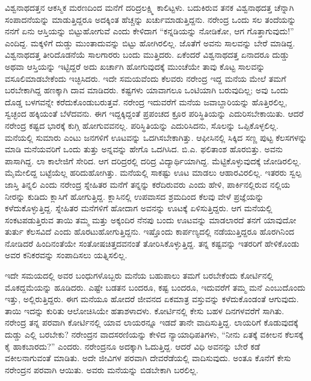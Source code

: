 ವಿಶ್ವನಾಥದತ್ತನ ಆಕಸ್ಮಿಕ ಮರಣದಿಂದ ಮನೆಗೆ ದರಿದ್ರಲಕ್ಷ್ಮಿ ಕಾಲಿಟ್ಟಳು. ಬದುಕಿರುವ ತನಕ ವಿಶ್ವನಾಥದತ್ತ ಚೆನ್ನಾಗಿ ಸಂಪಾದನೆಯನ್ನು ಮಾಡುತ್ತಿದ್ದರೂ ಅದಕ್ಕಿಂತ ಹೆಚ್ಚನ್ನು ಖರ್ಚುಮಾಡುತ್ತಿದ್ದನು. ನರೇಂದ್ರ ಒಂದು ಸಲ ತಂದೆಯನ್ನು ನನಗೆ ಏನು ಆಸ್ತಿಯನ್ನು ಬಿಟ್ಟುಹೋಗುವೆ ಎಂದು ಕೇಳಿದಾಗ “ಕನ್ನಡಿಯನ್ನು ನೋಡಿಕೋ, ಆಗ ಗೊತ್ತಾಗುವುದು!” ಎಂದಿದ್ದ. ಮಕ್ಕಳಿಗೆ ದುಡ್ಡು ಮುಂತಾದುವನ್ನು ಬಿಟ್ಟು ಹೋಗಿರಲಿಲ್ಲ. ಜೊತೆಗೆ ಅವನು ಸಾಲವನ್ನು ಬೇರೆ ಮಾಡಿದ್ದ. ವಿಶ್ವನಾಥದತ್ತ ತೀರಿದೊಡನೆಯೆ ಸಾಲಗಾರರು ಬಂದು ಮುತ್ತಿದರು. ಏಕೆಂದರೆ ವಿಶ್ವನಾಥದತ್ತ ಏನಾದರೂ ದುಡ್ಡು ಅಥವಾ ಆಸ್ತಿಯನ್ನು ಇಟ್ಟಿದ್ದರೆ ಅದು ಖರ್ಚಾಗಿ ಹೋಗುವುದಕ್ಕೆ ಮುಂಚೆಯೇ ತಾವು ಕೊಟ್ಟ ಸಾಲವನ್ನು ವಸೂಲಿಮಾಡಬೇಕೆಂದು ಇಚ್ಛಿಸಿದರು. ಇದೇ ಸಮಯವೆಂದು ಕೆಲವರು ನರೇಂದ್ರ ಇದ್ದ ಮನೆಯ ಮೇಲೆ ತಮಗೆ ಬರಬೇಕಾಗಿದ್ದ ಹಣಕ್ಕಾಗಿ ದಾವ ಮಾಡಿದರು. ಕಷ್ಟಗಳು ಯಾವಾಗಲೂ ಒಂಟಿಯಾಗಿ ಬರುವುದಿಲ್ಲ; ಅವು ಒಂದು ದೊಡ್ಡ ಬಳಗವನ್ನೇ ಕರೆದುಕೊಂಡುಬರುತ್ತವೆ. ನರೇಂದ್ರ ಇದುವರೆಗೆ ಮನೆಯ ಜವಾಬ್ದಾರಿಯನ್ನು ಹೊತ್ತಿರಲಿಲ್ಲ, ಸ್ವಚ್ಛಂದ ಹಕ್ಕಿಯಂತೆ ಬೆಳೆದವನು. ಈಗ ಇದ್ದಕ್ಕಿದ್ದಂತೆ ಪ್ರಪಂಚದ ಕ್ರೂರ ಪರಿಸ್ಥಿತಿಯನ್ನು ಎದುರಿಸಬೇಕಾಯಿತು. ಆದರೆ ನರೇಂದ್ರ ಕಷ್ಟದ ಭಾರಕ್ಕೆ ಕುಗ್ಗಿ ಹೋಗುವವನಲ್ಲ. ಪರಿಸ್ಥಿತಿಯನ್ನು ಎದುರಿಸಿದನು, ಸೊಲನ್ನು ಒಪ್ಪಿಕೊಳ್ಳಲಿಲ್ಲ. ಮನೆಯಲ್ಲಿ ಸುಮಾರು ಎಂಟು ಜನಗಳಿಗೆ ಊಟವನ್ನು ಒದಗಿಸಬೇಕಾಗಿತ್ತು. ಆಫೀಸಿನಲ್ಲಿ ಸಿಕ್ಕಿದ ಸಣ್ಣ ಪುಟ್ಟ ಕೆಲಸಗಳನ್ನು ಮಾಡಿ ಮನೆಯವರಿಗೆ ಒಂದು ತುತ್ತು ಅನ್ನವನ್ನು ಹೇಗೊ ಒದಗಿಸಿದ. ಬಿ.ಎ. ಫಲಿತಾಂಶ ಹೊರಬಿತ್ತು. ಅವನು ಪಾಸಾಗಿದ್ದ. ಲಾ ಕಾಲೇಜಿಗೆ ಸೇರಿದ. ಆಗ ದರಿದ್ರರಲ್ಲಿ ದರಿದ್ರ ವಿದ್ಯಾರ್ಥಿಯಾಗಿದ್ದ. ಮೆಟ್ಟಿಕೊಳ್ಳುವುದಕ್ಕೆ ಜೋಡಿರಲಿಲ್ಲ. ಮೈಮೇಲಿದ್ದ ಬಟ್ಟೆಯೆಲ್ಲ ಹರಿದುಹೋಗಿತ್ತು. ಮನೆಯಲ್ಲಿ ಸಾಕಷ್ಟು ಊಟ ಮಾಡಲು ಆಹಾರವಿರಲಿಲ್ಲ. ಇತರರು ಸ್ವಲ್ಪ ಜಾಸ್ತಿ ತಿನ್ನಲಿ ಎಂದು ನರೇಂದ್ರ ಸ್ನೇಹಿತರ ಮನೆಗೆ ತನ್ನನ್ನು ಕರೆದಿರುವರು ಎಂದು ಹೇಳಿ, ಪಾರ್ಕಿನಲ್ಲಿರುವ ನಲ್ಲಿಯ ನೀರನ್ನು ಕುಡಿದು ಕ್ಲಾಸಿಗೆ ಹೋಗುತ್ತಿದ್ದ. ಕ್ಲಾಸಿನಲ್ಲಿ ಉಪವಾಸದ ಶ್ರಮದಿಂದ ಕೆಲವು ವೇಳೆ ಪ್ರಜ್ಞೆಯನ್ನು ಕಳೆದುಕೊಳ್ಳುತ್ತಿದ್ದ. ಸ್ನೇಹಿತರ ಮನೆಗಳಿಗೆ ಹೋದಾಗ ಅವನನ್ನು ಊಟಕ್ಕೆ ಏಳಿಸುತ್ತಿದ್ದರು. ಆಗ ಮನೆಯಲ್ಲಿ ಸಂಕಟಪಡುತ್ತಿರುವ ತಾಯಿ ತಮ್ಮ ಮತ್ತು ಅಕ್ಕಂದಿರ ನೆನಪು ಬಂದು ಊಟವನ್ನು ಮಾಡಲಾರದೆ ತನಗೆ ಯಾವುದೋ ತುರ್ತು ಕೆಲಸವಿದೆ ಎಂದು ಹೊರಟುಹೋಗುತ್ತಿದ್ದನು. ಇಷ್ತೊಂದು ಕಾರ್ಪಣ್ಯದಲ್ಲಿ ನಡೆಯುತ್ತಿದ್ದರೂ ಹೊರಗಿನಿಂದ ನೋಡಿದರೆ ಹಿಂದಿನಂತೆಯೇ ಸಂತೋಷಚಿತ್ತದವನಂತೆ ತೋರಿಸಿಕೊಳ್ಳುತ್ತಿದ್ದ. ತನ್ನ ಕಷ್ಟವನ್ನು ಇತರರಿಗೆ ಹೇಳಿಕೊಂಡು ಅವರ ಕನಿಕರವನ್ನು ಸಂಪಾದಿಸಲು ಯತ್ನಿಸಲಿಲ್ಲ.

ಇದೇ ಸಮಯದಲ್ಲಿ ಅವರ ಬಂಧುಗಳೊಬ್ಬರು ಮನೆಯ ಬಹುಪಾಲು ತಮಗೆ ಬರಬೇಕೆಂದು ಕೋರ್ಟಿನಲ್ಲಿ ಮೊಕದ್ದಮೆಯನ್ನು ಹೂಡಿದರು. ಎಷ್ಟೇ ಬಡತನ ಬಂದರೂ, ಕಷ್ಟ ಬಂದರೂ, ಇದುವರೆಗೆ ತಮ್ಮ ಮನೆ ಎಂಬುದೊಂದು ಇತ್ತು, ಅಲ್ಲಿರುತ್ತಿದ್ದರು. ಈಗ ಮನೆಯೂ ಹೋದರೆ ಜೀವನದ ಏಕಮಾತ್ರ ವಸ್ತುವನ್ನು ಕಳೆದುಕೊಂಡಂತೆ ಆಗುವುದು. ತಾಯಿ ಇದನ್ನು ಕುರಿತು ಆಲೋಚಿಸಿಯೇ ಹತಾಶಳಾದಳು. ಕೋರ್ಟಿನಲ್ಲಿ ಕೇಸು ಬಹಳ ದಿನಗಳವರೆಗೆ ಸಾಗಿತು. ನರೇಂದ್ರ ತನ್ನ ಪರವಾಗಿ ಕೋರ್ಟಿನಲ್ಲಿ ಯಾವ ಲಾಯರನ್ನೂ ಇಡದೆ ತಾನೇ ವಾದಿಸುತ್ತಿದ್ದ. ಲಾಯರಿಗೆ ಕೊಡುವುದಕ್ಕೆ ದುಡ್ಡು ಎಲ್ಲಿ ಬರಬೇಕು? ನರೇಂದ್ರನ ವಾದಸರಣಿಯನ್ನು ಕೇಳಿದ ನ್ಯಾಯಾಧಿಪತಿಗಳು, “ನೀನು ಏತಕ್ಕೆ ವಕೀಲನ ಕೆಲಸಕ್ಕೆ ಕೈ ಹಾಕಬಾರದು?” ಎಂದರು. ನರೇಂದ್ರನೂ ಅದಕ್ಕಾಗಿ ಓದುತ್ತಿದ್ದ. ಆದರೆ ವಿಧಿ ಅವನನ್ನು ಬೇರೆ ಕಡೆ ವಕೀಲನಾಗುವಂತೆ ಮಾಡಿತು. ಅದೇ ಜೀವಿಗಳ ಪರವಾಗಿ ದೇವರೆಡೆಯಲ್ಲಿ ವಾದಿಸುವುದು. ಅಂತೂ ಕೊನೆಗೆ ಕೇಸು ನರೇಂದ್ರನ ಪರವಾಗಿ ಆಯಿತು. ಅವರು ಮನೆಯನ್ನು ಬಿಡಬೇಕಾಗಿ ಬರಲಿಲ್ಲ.

